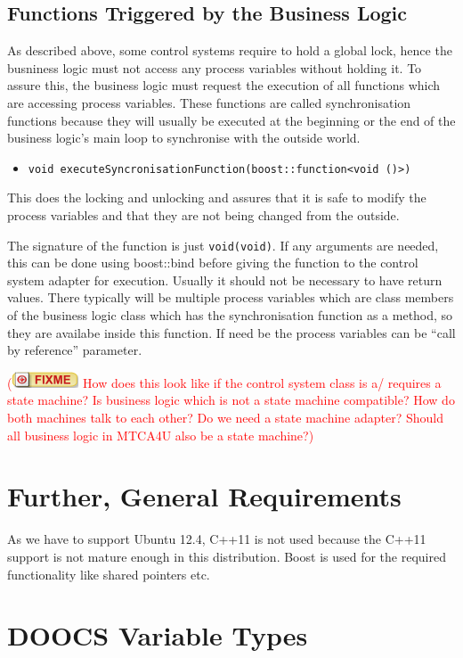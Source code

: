 \documentclass[11pt,a4paper]{scrartcl}
\newcounter{nFixmes}
\newcommand{\fixme}[1]{\addtocounter{nFixmes}{1}\textcolor{red}{(\includegraphics[height=2ex]{fixme} #1)}\xspace}
\begin{document}
\subsection{Functions Triggered by the Business Logic}
As described above, some control systems require to hold a global lock, hence the busniness logic
must not access any process variables without holding it. To assure this, the business logic must
request the execution of all functions which are accessing process variables. These functions are called
synchronisation functions because they will usually be executed at the beginning or the end of 
the business logic's main loop to synchronise with the outside world.

\begin{itemize}
  \item \texttt{void executeSyncronisationFunction(boost::function<void ()>)}
\end{itemize}
This does the locking and unlocking and assures that
it is safe to modify the process variables and that they are not being changed
from the outside.

The signature of the function is just \texttt{void(void)}. If any arguments are needed, this can be done
using boost::bind before giving the function to the control system adapter for execution. Usually it
should not be necessary to have return values. There typically will be multiple process variables which
are class members of the business logic class which has the synchronisation function as a method, so
they are availabe inside this function. If need be the process variables can be ``call by reference''
parameter.

\fixme{How does this look like if the control system class is a/ requires a state machine?
Is business logic which is not a state machine compatible? How do both machines talk to each other?
Do we need a state machine adapter? Should all business logic in MTCA4U also be a state machine?}

\section{Further, General Requirements}
As we have to support Ubuntu 12.4, C++11 is not used because the C++11 support
is not mature enough in this distribution. Boost is used for the required
functionality like shared pointers etc.

\appendix
\section{DOOCS Variable Types}
\end{document}
